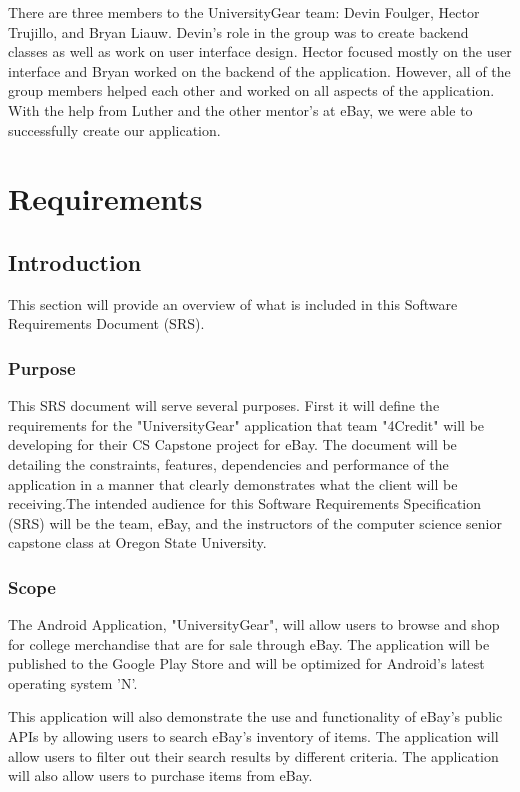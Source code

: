 \documentclass[journal,compsoc, 10pt, draftclsnofoot, onecolumn]{IEEEtran}
\begin{document}
There are three members to the UniversityGear team: Devin Foulger, Hector 
Trujillo, and Bryan Liauw. Devin's role in the group was to create backend 
classes as well as work on user interface design. Hector focused mostly on 
the user interface and Bryan worked on the backend of the application. 
However, all of the group members helped each other and worked on 
all aspects of the application. With the help from Luther and the other mentor's 
at eBay, we were able to successfully create our application. 

\section{Requirements}

\subsection{Introduction}

This section will provide an overview of what is included in this Software 
Requirements Document (SRS).

\subsubsection{Purpose}

This SRS document will serve several purposes. First it will define the 
requirements for the "UniversityGear" application that team "4Credit"
 will be developing for their CS Capstone project for eBay. The 
document will be detailing the constraints, features, dependencies and performance 
of the application in a manner that clearly demonstrates what the client will be
 receiving.The intended audience for this Software Requirements Specification 
(SRS) will be the team, eBay, and the instructors of the computer science senior
 capstone class at Oregon State University. 

\subsubsection{Scope}

The Android Application, "UniversityGear", will allow users to browse and 
shop for college merchandise that are for sale through eBay. The application 
will be published to the Google Play Store and will be optimized for Android's 
latest operating system 'N'. \newline

This application will also demonstrate the use and functionality of eBay's 
public APIs by allowing users to search eBay's inventory of items. The 
application will allow users to filter out their search results by different 
criteria. The application will also allow users to purchase items from eBay. 
\end{document}
